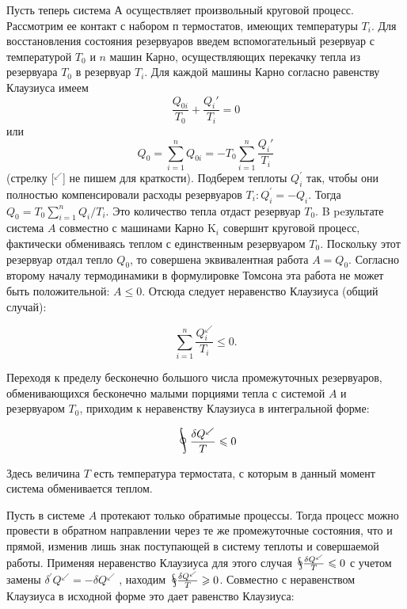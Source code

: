 \documentclass[a4paper,14pt]{article} %
\DeclareMathOperator*{\myoint}{\ThisStyle{\rotatebox{25}{$\SavedStyle\!\oint\!\!\!$}}}
\begin{document}
Пусть теперь система А осуществляет произвольный круговой процесс. Рассмотрим ее контакт с набором $п$ термостатов, имеющих температуры $T_i$. Для восстановления состояния резервуаров введем вспомогательный резервуар с температурой $T_0$ и $n$ машин Карно, осуществляющих перекачку тепла из резервуара $T_0$ в резервуар $T_i$. Для каждой машины Карно согласно равенству Клаузиуса имеем
\[\frac{Q_{0i}}{T_0} + \frac{Q_i'}{T_i} = 0\]
или
\[Q_0 = \sum\limits_{i = 1}^n Q_{0i} = -T_0\sum\limits_{i=1}^n \frac {Q_i'}{T_i}\]
(стрелку [$^{\swarrow}$] не пишем для краткости). Подберем теплоты $Q_{i}^{\prime}$ так, чтобы они полностью компенсировали расходы резервуаров $T_{i}: Q_{i}^{\prime}=-Q_{i} .$ Тогда $Q_{0}=T_{0} \sum_{i=1}^{n} Q_{i} / T_{i} .$ Это количество тепла отдаст резервуар $T_{0} .$ B peзультате система $A$ совместно с машинами Карно $\mathrm{K}_{i}$ совершнт круговой процесс, фактически обмениваясь теплом с единственным резервуаром $T_{0}$. Поскольку этот резервуар отдал тепло $Q_{0}$, то совершена эквивалентная работа $A=Q_{0} .$ Согласно второму началу термодинамики в формулировке Томсона эта работа не может быть положительной: $A \leqslant 0 .$ Отсюда следует неравенство Клаузиуса (общий случай):

\begin{equation*}
\sum_{i=1}^{n} \frac{Q_{i}^{\swarrow}}{T_{i}} \leqslant 0.
\end{equation*}

Переходя к пределу бесконечно большого числа промежуточных резервуаров, обменивающихся бесконечно малыми порциями тепла с системой $A$ и резервуаром $T_0$, приходим к неравенству Клаузиуса в интегральной форме:

\begin{equation*}
\myoint \frac{\delta Q^{\swarrow}}{T} \leqslant 0
\end{equation*}

Здесь величина $T$ есть температура термостата, с которым в данный
момент система обменивается теплом.

Пусть в системе $A$ протекают только обратимые процессы. Тогда процесс можно провести в обратном направлении через те же промежуточные состояния, что и прямой, изменив лишь знак поступающей в систему теплоты и совершаемой работы. Применяя неравенство Клаузиуса
для этого случая $\myoint \frac{\delta Q^{\swarrow}}{T} \leqslant 0$ с учетом замены $\delta^{\prime} Q^{\swarrow}= - \delta Q^{\swarrow}$ , находим $\myoint \frac{\delta Q^{\swarrow}}{T} \geqslant 0$. Совместно с неравенством Клаузиуса в исходной форме это
дает равенство Клаузиуса:
\end{document}
